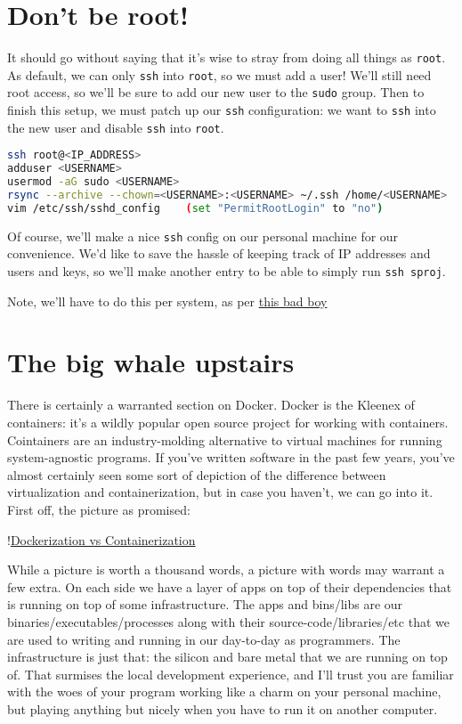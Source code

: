 \documentclass[11pt, twoside, reqno]{book}
\begin{document}
\section{Don't be root!}

It should go without saying that it's wise to stray from doing all things as \texttt{root}. As default, we can only \texttt{ssh} into \texttt{root}, so we must add a user! We'll still need root access, so we'll be sure to add our new user to the \texttt{sudo} group. Then to finish this setup, we must patch up our \texttt{ssh} configuration: we want to \texttt{ssh} into the new user and disable \texttt{ssh} into \texttt{root}.
\begin{lstlisting}[language=sh]
ssh root@<IP_ADDRESS>
adduser <USERNAME>
usermod -aG sudo <USERNAME> 
rsync --archive --chown=<USERNAME>:<USERNAME> ~/.ssh /home/<USERNAME> 
vim /etc/ssh/sshd_config    (set "PermitRootLogin" to "no")
\end{lstlisting}

Of course, we'll make a nice \texttt{ssh} config on our personal machine for our convenience. We'd like to save the hassle of keeping track of IP addresses and users and keys, so we'll make another entry to be able to simply run \texttt{ssh sproj}.

Note, we'll have to do this per system, as per \href{https://www.digitalocean.com/community/questions/error-permission-denied-publickey-when-i-try-to-ssh}{this bad boy}

\section{The big whale upstairs}

There is certainly a warranted section on Docker. Docker is the Kleenex of containers: it's a wildly popular open source project for working with containers. Cointainers are an industry-molding alternative to virtual machines for running system-agnostic programs. If you've written software in the past few years, you've almost certainly seen some sort of depiction of the difference between virtualization and containerization, but in case you haven't, we can go into it. First off, the picture as promised:

!\href{https://blog.netapp.com/wp-content/uploads/2016/03/Screen-Shot-2018-03-20-at-9.24.09-AM-1024x548.png}{Dockerization vs Containerization}

While a picture is worth a thousand words, a picture with words may warrant a few extra. On each side we have a layer of apps on top of their dependencies that is running on top of some infrastructure. The apps and bins/libs are our binaries/executables/processes along with their source-code/libraries/etc that we are used to writing and running in our day-to-day as programmers. The infrastructure is just that: the silicon and bare metal that we are running on top of. That surmises the local development experience, and I'll trust you are familiar with the woes of your program working like a charm on your personal machine, but playing anything but nicely when you have to run it on another computer.
\end{document}
